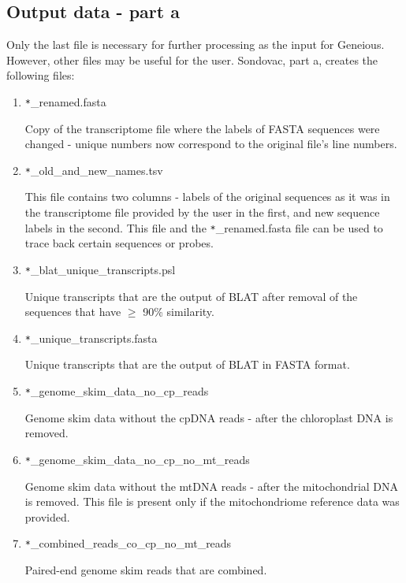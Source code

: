 \subsection{Output data - part a}

Only the last file is necessary for further processing as the input for Geneious. However, other files may be useful for the user. 
Sondovac, part a, creates the following files: 

\begin{enumerate}

\item \verb_*_\_renamed.fasta 

Copy of the transcriptome file where the labels of FASTA sequences were changed - unique numbers now correspond to the original file's line numbers. 

\item \verb_*_\_old\_and\_new\_names.tsv 

This file contains two columns - labels of the original sequences as it was in the transcriptome file provided by the user in the first, and new sequence labels in the 
second. This file and the \verb_*_\_renamed.fasta file can be used to trace back certain sequences or probes. 

\item \verb_*_\_blat\_unique\_transcripts.psl

Unique transcripts that are the output of BLAT after removal of the sequences that have $\geq$ 90\% similarity. 

\item \verb_*_\_unique\_transcripts.fasta

Unique transcripts that are the output of BLAT in FASTA format. 

\item \verb_*_\_genome\_skim\_data\_no\_cp\_reads

Genome skim data without the cpDNA reads - after the chloroplast DNA is removed. 

\item \verb_*_\_genome\_skim\_data\_no\_cp\_no\_mt\_reads

Genome skim data without the mtDNA reads - after the mitochondrial DNA is removed. This file is present only if the mitochondriome reference data was provided. 

\item \verb_*_\_combined\_reads\_co\_cp\_no\_mt\_reads

Paired-end genome skim reads that are combined. 


\end{enumerate}
